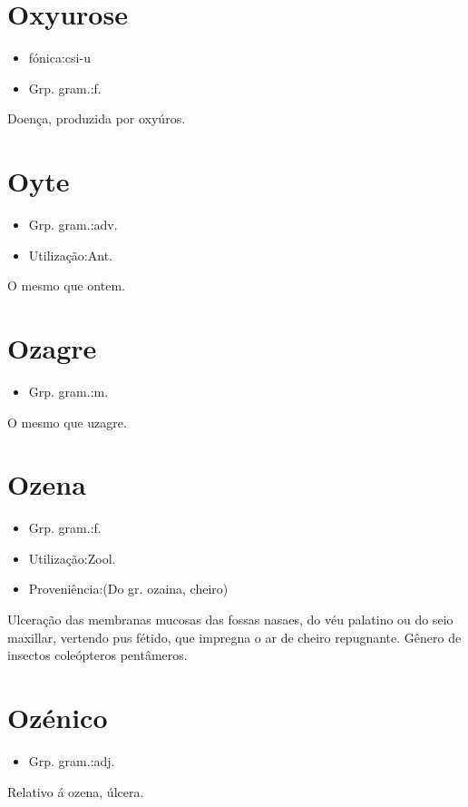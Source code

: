\section{Oxyurose}
\begin{itemize}
\item {fónica:csi-u}
\end{itemize}
\begin{itemize}
\item {Grp. gram.:f.}
\end{itemize}
Doença, produzida por oxyúros.
\section{Oyte}
\begin{itemize}
\item {Grp. gram.:adv.}
\end{itemize}
\begin{itemize}
\item {Utilização:Ant.}
\end{itemize}
O mesmo que \textunderscore ontem\textunderscore .
\section{Ozagre}
\begin{itemize}
\item {Grp. gram.:m.}
\end{itemize}
O mesmo que \textunderscore uzagre\textunderscore .
\section{Ozena}
\begin{itemize}
\item {Grp. gram.:f.}
\end{itemize}
\begin{itemize}
\item {Utilização:Zool.}
\end{itemize}
\begin{itemize}
\item {Proveniência:(Do gr. \textunderscore ozaina\textunderscore , cheiro)}
\end{itemize}
Ulceração das membranas mucosas das fossas nasaes, do véu palatino ou do seio maxillar, vertendo pus fétido, que impregna o ar de cheiro repugnante.
Gênero de insectos coleópteros pentâmeros.
\section{Ozénico}
\begin{itemize}
\item {Grp. gram.:adj.}
\end{itemize}
Relativo á ozena, úlcera.
